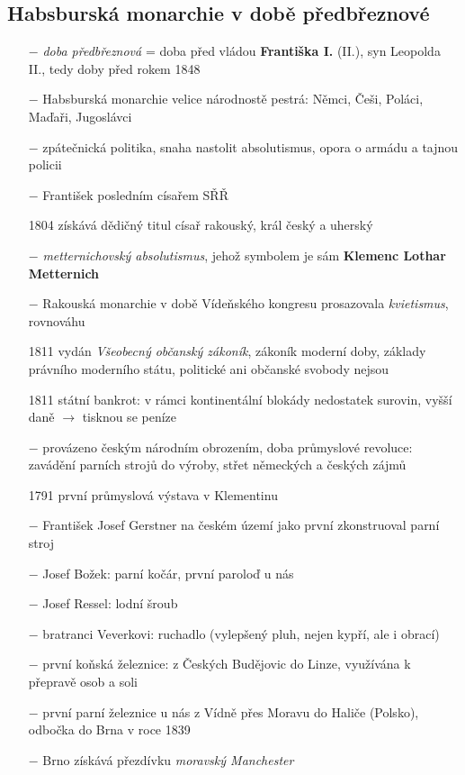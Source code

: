 \documentclass{article}
\begin{document}
\subsection*{Habsburská monarchie v době předbřeznové}
\begin{itemize}
    \vspace{-0.5em}
    \setlength\itemsep{0.15em}
    \item[$-$] \textit{doba předbřeznová} = doba před vládou \textbf{Františka I.} (II.), syn Leopolda II., tedy doby před rokem 1848
    \item[$-$] Habsburská monarchie velice národnostě pestrá: Němci, Češi, Poláci, Maďaři, Jugoslávci
    \item[$-$] zpátečnická politika, snaha nastolit absolutismus, opora o armádu a tajnou policii
    \item[$-$] František posledním císařem SŘŘ
    \item[1804] získává dědičný titul císař rakouský, král český a uherský
    \item[$-$] \textit{metternichovský absolutismus}, jehož symbolem je sám \textbf{Klemenc Lothar Metternich}
    \item[$-$] Rakouská monarchie v době Vídeňského kongresu prosazovala \textit{kvietismus}, rovnováhu
    \item[1811] vydán \textit{Všeobecný občanský zákoník}, zákoník moderní doby, základy právního moderního státu, politické ani občanské svobody nejsou
    \item[1811] státní bankrot: v rámci kontinentální blokády nedostatek surovin, vyšší daně $\rightarrow$ tisknou se peníze
    \item[$-$] provázeno českým národním obrozením, doba průmyslové revoluce: zavádění parních strojů do výroby, střet německých a českých zájmů
    \item[1791] první průmyslová výstava v Klementinu
    \item[$-$] František Josef Gerstner na českém území jako první zkonstruoval parní stroj
    \item[$-$] Josef Božek: parní kočár, první paroloď u nás
    \item[$-$] Josef Ressel: lodní šroub
    \item[$-$] bratranci Veverkovi: ruchadlo (vylepšený pluh, nejen kypří, ale i obrací)
    \item[$-$] první koňská železnice: z Českých Budějovic do Linze, využívána k přepravě osob a soli
    \item[$-$] první parní železnice u nás z Vídně přes Moravu do Haliče (Polsko), odbočka do Brna v roce 1839
    \item[$-$] Brno získává přezdívku \textit{moravský Manchester}
\end{itemize}
\end{document}
